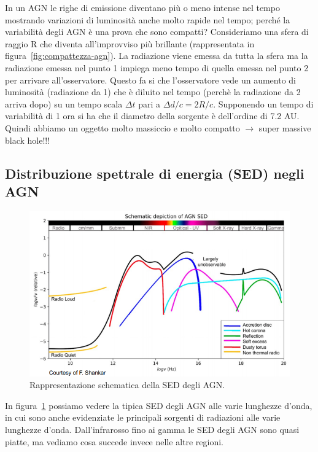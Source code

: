 In un AGN le righe di emissione diventano più o meno intense nel tempo mostrando variazioni di luminosità anche molto rapide nel tempo; perché la variabilità degli AGN è una prova che sono compatti? Consideriamo una sfera di raggio R che diventa all’improvviso più brillante (rappresentata in figura~\ref{fig:compattezza-agn}). La radiazione viene emessa da tutta la sfera ma la radiazione emessa nel punto 1 impiega meno tempo di quella emessa nel punto 2 per arrivare all’osservatore. Questo fa si che l’osservatore vede un aumento di luminosità (radiazione da 1) che è diluito nel tempo (perchè la radiazione da 2 arriva dopo) su un tempo scala $\Delta t$ pari a $\Delta d/c = 2R/c$. Supponendo un tempo di variabilità di 1 ora si ha che il diametro della sorgente è dell’ordine di 7.2 AU. Quindi abbiamo un oggetto molto massiccio e molto compatto $\rightarrow$ super massive black hole!!!

\subsection{Distribuzione spettrale di energia (SED) negli AGN}

\begin{figure}
    \centering
    \includegraphics[width = 0.8 \textwidth]{immagini/sed-agn.png}
    \caption{Rappresentazione schematica della SED degli AGN.}
    \label{fig:sed-agn}
\end{figure}
In figura~\ref{fig:sed-agn} possiamo vedere la tipica SED degli AGN alle varie lunghezze d’onda, in cui sono anche evidenziate le principali sorgenti di radiazioni alle varie lunghezze d'onda. Dall’infrarosso fino ai gamma le SED degli AGN sono quasi piatte, ma vediamo cosa succede invece nelle altre regioni.

